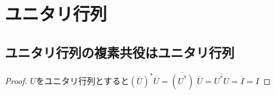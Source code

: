 \chapter{ユニタリ行列}
    \section{ユニタリ行列の複素共役はユニタリ行列}
        \begin{proof}
            \quad $U$をユニタリ行列とすると$\left(\overline{U}\right
            )^*\overline{U} = \overline{(U^*)}\;\overline{U} = \overline{U^*U} = \overline{I} = I$
        \end{proof}